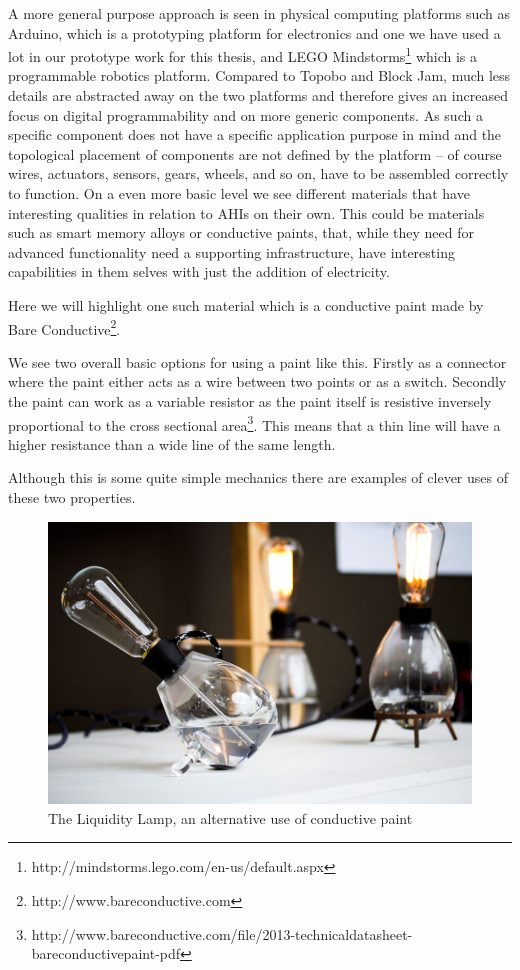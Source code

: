 A more general purpose approach is seen in physical computing platforms such as Arduino, which is a prototyping platform for electronics and one we have used a lot in our prototype work for this thesis, and LEGO Mindstorms\footnote{http://mindstorms.lego.com/en-us/default.aspx} which is a programmable robotics platform.
Compared to Topobo and Block Jam, much less details are abstracted away on the two platforms and therefore gives an increased focus on digital programmability and on more generic components.
As such a specific component does not have a specific application purpose in mind and the topological placement of components are not defined by the platform -- of course wires, actuators, sensors, gears, wheels, and so on, have to be assembled correctly to function.
\blank
On a even more basic level we see different materials that have interesting qualities in relation to AHIs on their own.
This could be materials such as smart memory alloys or conductive paints, that, while they need for advanced functionality need a supporting infrastructure, have interesting capabilities in them selves with just the addition of electricity.

Here we will highlight one such material which is a conductive paint made by Bare Conductive\footnote{http://www.bareconductive.com}.

We see two overall basic options for using a paint like this.
Firstly as a connector where the paint either acts as a wire between two points or as a switch.
Secondly the paint can work as a variable resistor as the paint itself is resistive inversely proportional to the cross sectional area\footnote{http://www.bareconductive.com/file/2013-technicaldatasheet-bareconductivepaint-pdf}. 
This means that a thin line will have a higher resistance than a wide line of the same length.

Although this is some quite simple mechanics there are examples of clever uses of these two properties.

\begin{figure}[h]
  \centering
  \begin{minipage}[b]{.8\textwidth}
    \centering
    \includegraphics[width=.7\linewidth]{figures/proto3/liquidity_lamp}
	\caption{The Liquidity Lamp, an alternative use of conductive paint}
   \label{liquidity_lamp}
   \end{minipage}
\end{figure}

